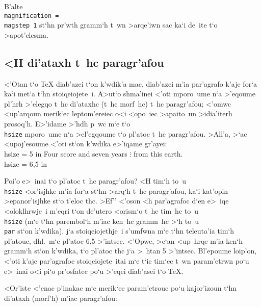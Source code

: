 \exercise B'alte {\tt \\magnification = \\magstep 1} st`hn pr'wth
gram\-m`h t~wn >arqe'iwn sac ka`i de~ite t`o >apot'elesma.

\subsection{<H di'ataxh t~hc paragr'afou}

<'Otan t`o {\rm \TeX} diab'azei t`on k'wdik'a mac, diab'azei m'ia
par'agrafo k'aje for`a ka`i met`a t`hn stoiqeiojete~i.  A>ut`o shma'inei
<'oti mporo~ume n`a >'eqoume pl'hrh >'elegqo t~hc di'ataxhc (t~hc
morf~hc) t~hc paragr'afou; <'omwc <up'arqoun merik`ec leptom'ereiec o<i
<opo~iec >apaito~un >idia'iterh prosoq'h. E>'idame >'hdh p~wc m`e t`o
{\tt \\hsize} mporo~ume n`a >el'egqoume t`o pl'atoc t~hc paragr'afou. 
>All'a, >`ac <upoj'esoume <'oti st`on k'wdika e>'iqame gr'ayei:
\beginuser
\\hsize = 5 in
Four score and seven years
$\vdots$
from this earth.
\\hsize = 6,5 in
\enduser

Poi'o e>~inai t`o pl'atoc t~hc paragr'afou?  <H tim`h to~u {\tt \\hsize}
<or'isjhke m'ia for`a st`hn >arq`h t~hc paragr'afou, ka`i kat'opin
>epanor'isjhke st`o t'eloc thc.  >Ef'' <'oson <h par'agrafoc d`en e>~iqe
<oloklhrwje~i m'eqri t`on de'utero <orism`o t~hc tim~hc to~u {\tt
\\hsize} (m`e t`hn parembol`h m'iac ken~hc gramm~hc >`h to~u {\tt \\par}
st`on k'wdika), j`a stoiqeiojethje~i s'umfwna m`e t`hn teleuta'ia tim`h
pl'atouc, dhl.\ m`e pl'atoc 6,5 >'intsec.  <'Opwc, >e`an <up~hrqe m'ia
ken`h gramm`h st`on k'wdika, t`o pl'atoc thc j`a >~htan 5 >'intsec. 
Bl'epoume loip'on, <'oti k'aje par'agrafoc stoiqeiojete~itai m`e t`ic
tim`ec t~wn  param'etrwn po`u e>~inai o<i pi`o pr'osfatec po`u >'eqei
diab'asei t`o   {\rm \TeX}.

<Or'iste <'enac p'inakac m`e merik`ec param'etrouc po`u kajor'izoun t`hn
di'ataxh (morf'h) m'iac para\-gr'a\-fou:

\par
{}

